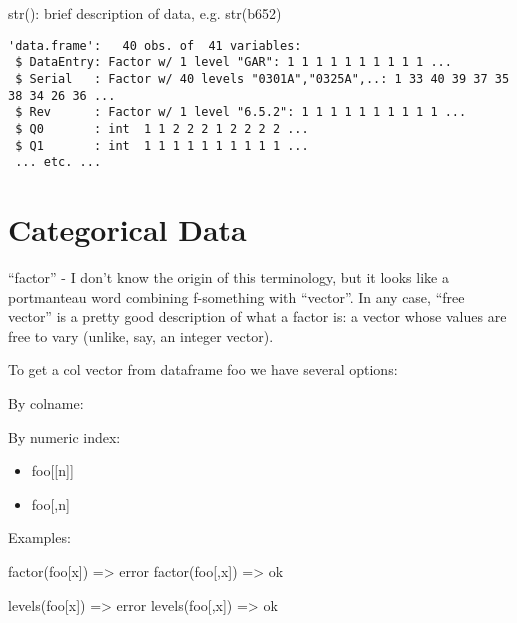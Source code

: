 str(): brief description of data, e.g.
str(b652)

\begin{verbatim}
'data.frame':	40 obs. of  41 variables:
 $ DataEntry: Factor w/ 1 level "GAR": 1 1 1 1 1 1 1 1 1 1 ...
 $ Serial   : Factor w/ 40 levels "0301A","0325A",..: 1 33 40 39 37 35 38 34 26 36 ...
 $ Rev      : Factor w/ 1 level "6.5.2": 1 1 1 1 1 1 1 1 1 1 ...
 $ Q0       : int  1 1 2 2 2 1 2 2 2 2 ...
 $ Q1       : int  1 1 1 1 1 1 1 1 1 1 ...
 ... etc. ...
\end{verbatim}

\section{Categorical Data}

``factor'' - I don't know the origin of this terminology, but it looks
like a portmanteau word combining f-something with ``vector''.  In any
case, ``free vector'' is a pretty good description of what a factor
is: a vector whose values are free to vary (unlike, say, an integer
vector).

To get a col vector from dataframe foo we have several options:

\noindent By colname:


\noindent By numeric index:

\begin{itemize}
\item foo[[n]]
\item foo[,n]
\end{itemize}

Examples:

	factor(foo[x])  => error
	factor(foo[,x])  => ok

	levels(foo[x])  => error
	levels(foo[,x])  => ok


